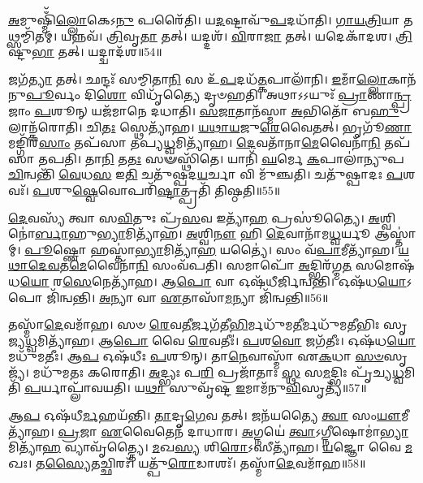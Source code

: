 \-\ul{𑌅}\-𑌮𑍁𑌷𑍍𑌮𑌿𑌁᳴\-\ul{𑌲𑍍𑌲𑍋}\-𑌕𑍇𑌽\-\ul{𑌨𑍁} 𑌪𑌰𑍈᳴𑌤𑌿।
𑌯\-\ul{𑌦}\-𑌷𑍍𑌟𑌾𑌵𑍁᳴\-\ul{𑌪}\-𑌦𑌧𑌾᳴𑌤𑌿।
\-\ul{𑌗𑌾}\-\-\ul{𑌯}\-\-\ul{𑌤𑍍𑌰𑌿}\-𑌯𑌾 𑌤𑌥𑍍𑌸𑌮𑍍𑌮𑌿᳴𑌤𑌮𑍍।
𑌯𑌨𑍍𑌨𑌵᳴।
\-\ul{𑌤𑍍𑌰𑌿}\-𑌵𑍃\-\ul{𑌤𑌾} 𑌤𑌤𑍍।
𑌯𑌦𑍍𑌦𑌶᳴।
\-\ul{𑌵𑌿}\-𑌰𑌾\-\ul{𑌜𑌾} 𑌤𑌤𑍍।
𑌯𑌦𑍇𑌕𑌾᳴𑌦𑌶।
\-\ul{𑌤𑍍𑌰𑌿}\-𑌷𑍍𑌟𑍁\-\ul{𑌭𑌾} 𑌤𑌤𑍍।
𑌯𑌦𑍍𑌦𑍍𑌵𑌾𑌦᳴𑌶॥54॥

𑌜𑌗᳴\-\ul{𑌤𑍍𑌯𑌾} 𑌤𑌤𑍍।
𑌛𑌨𑍍𑌦𑌃᳴ 𑌸𑌮𑍍𑌮𑌿𑌤𑌾\-\ul{𑌨𑌿} 𑌸 𑌉᳴\-\ul{𑌪}\-𑌦𑌧᳴\-\ul{𑌤𑍍𑌕}\-𑌪𑌾𑌲𑌾᳴𑌨𑌿।
\-\ul{𑌇}\-𑌮𑌾𑌁\-\ul{𑌲𑍍𑌲𑍋}\-𑌕𑌾𑌨᳴𑌨𑍁\-\ul{𑌪𑍂}\-𑌰𑍍𑌵𑌂 𑌦𑌿\-\ul{𑌶𑍋} 𑌵𑌿𑌧𑍃᳴𑌤𑍍𑌯𑍈 𑌦𑍃𑍞𑌹𑌤𑌿।
𑌅𑌥𑌾𑌽𑌽𑌯𑍁𑌃᳴ \ul{𑌪𑍍𑌰𑌾}\-𑌣𑌾\-\ul{𑌨𑍍𑌪𑍍𑌰}\-𑌜𑌾𑌂 \ul{𑌪}\-𑌶𑍂𑌨𑍍 𑌯𑌜᳴𑌮𑌾𑌨𑍇 𑌦𑌧𑌾𑌤𑌿।
\-\ul{𑌸}\-\-\ul{𑌜𑌾}\-𑌤𑌾𑌨᳴𑌸𑍍𑌮𑌾 \ul{𑌅}\-𑌭𑌿𑌤𑍋᳴ 𑌬\-\ul{𑌹𑍁}\-𑌲𑌾𑌨𑍍𑌕᳴𑌰𑍋𑌤𑌿।
𑌚𑌿\-\ul{𑌤𑌃} 𑌸𑍍𑌥𑍇𑌤𑍍𑌯𑌾᳴𑌹।
\-\ul{𑌯}\-\-\ul{𑌥𑌾}\-\-\ul{𑌯}\-𑌜𑍁\-\ul{𑌰𑍇}\-𑌵𑍈𑌤𑌤𑍍।
𑌭𑍃𑌗𑍂᳴\-\ul{𑌣𑌾}\-𑌮𑌙𑍍𑌗𑌿᳴𑌰\-\ul{𑌸𑌾𑌂} 𑌤𑌪᳴𑌸𑌾 𑌤𑌪𑍍𑌯\-\ul{𑌧𑍍𑌵}\-𑌮𑌿𑌤𑍍𑌯𑌾᳴𑌹।
\-\ul{𑌦𑍇}\-𑌵𑌤𑌾᳴𑌨𑌾\-\ul{𑌮𑍇}\-𑌵𑍈𑌨𑌾᳴\-\ul{𑌨𑌿} 𑌤𑌪᳴𑌸𑌾 𑌤𑌪𑌤𑌿।
𑌤𑌾\-\ul{𑌨𑌿} 𑌤\-\ul{𑌤𑌃} 𑌸𑍟𑌸𑍍𑌥𑌿᳴𑌤𑍇।
𑌯𑌾𑌨𑌿᳴ \ul{𑌘}\-𑌰𑍍𑌮𑍇 \ul{𑌕}\-𑌪𑌾𑌲𑌾॑𑌨𑍍𑌯𑍁𑌪\-\ul{𑌚𑌿}\-𑌨𑍍𑌵𑌨𑍍𑌤𑌿᳴ \ul{𑌵𑍇}\-𑌧\-\ul{𑌸} 𑌇\-\ul{𑌤𑌿} 𑌚𑌤𑍁᳴𑌷𑍍𑌪𑌦\-\ul{𑌯}\-𑌰𑍍𑌚𑌾 𑌵𑌿 𑌮𑍁᳴𑌞𑍍𑌚𑌤𑌿।
𑌚𑌤𑍁᳴𑌷𑍍𑌪𑌾𑌦𑌃 \ul{𑌪}\-𑌶𑌵𑌃᳴।
\-\ul{𑌪}\-𑌶𑍁\-\ul{𑌷𑍍𑌵𑍇}\-𑌵𑍋𑌪𑌰𑌿᳴\-\ul{𑌷𑍍𑌟𑌾}\-𑌤𑍍𑌪𑍍𑌰𑌤𑌿᳴ 𑌤𑌿𑌷𑍍𑌠𑌤𑌿॥55॥

\-\ul{𑌦𑍇}\-𑌵𑌸𑍍𑌯᳴ 𑌤𑍍𑌵𑌾 𑌸\-\ul{𑌵𑌿}\-𑌤𑍁𑌃 𑌪𑍍𑌰᳴\-\ul{𑌸}\-𑌵 𑌇𑌤𑍍𑌯𑌾᳴\-\ul{𑌹} 𑌪𑍍𑌰𑌸𑍂॑𑌤𑍍𑌯𑍈।
\-\ul{𑌅}\-𑌶𑍍𑌵𑌿𑌨𑍋॑\-\ul{𑌰𑍍𑌬𑌾}\-𑌹𑍁\-\ul{𑌭𑍍𑌯𑌾}\-𑌮𑌿\-𑌤𑍍𑌯𑌾᳴𑌹।
\-\ul{𑌅}\-𑌶𑍍𑌵𑌿\-\ul{𑌨𑍗} 𑌹𑌿 \ul{𑌦𑍇}\-𑌵𑌾𑌨𑌾᳴𑌮\-\ul{𑌧𑍍𑌵}\-𑌰𑍍𑌯𑍂 𑌆𑌸𑍍𑌤𑌾॑𑌮𑍍।
\-\ul{𑌪𑍂}\-𑌷𑍍𑌣𑍋 𑌹𑌸𑍍𑌤𑌾॑\-\ul{𑌭𑍍𑌯𑌾}\-𑌮𑌿𑌤𑍍𑌯𑌾᳴\-\ul{𑌹} 𑌯𑌤𑍍𑌯𑍈॑।
𑌸𑌂 𑌵᳴\-\ul{𑌪𑌾}\-𑌮𑍀𑌤𑍍𑌯𑌾᳴𑌹।
\-\ul{𑌯}\-\-\ul{𑌥𑌾}\-\-\ul{𑌦𑍇}\-\-\ul{𑌵}\-𑌤\-\ul{𑌮𑍇}\-𑌵𑍈𑌨𑌾᳴\-\ul{𑌨𑌿} 𑌸𑌂𑌵᳴𑌪𑌤𑌿।
𑌸𑌮𑌾𑌪𑍋᳴ \ul{𑌅}\-𑌦𑍍𑌭𑌿𑌰᳴𑌗𑍍𑌮\-\ul{𑌤} 𑌸𑌮𑍋𑌷᳴𑌧\-\ul{𑌯𑍋} 𑌰\-\ul{𑌸𑍇}\-𑌨𑍇𑌤𑍍𑌯𑌾᳴𑌹।
𑌆\-\ul{𑌪𑍋} 𑌵𑌾 𑌓𑌷᳴𑌧𑍀𑌰𑍍𑌜𑌿𑌨𑍍𑌵𑌨𑍍𑌤𑌿।
𑌓𑌷᳴𑌧\-\ul{𑌯𑍋}\-𑌽𑌪𑍋 𑌜𑌿᳴𑌨𑍍𑌵𑌨𑍍𑌤𑌿।
\-\ul{𑌅}\-𑌨𑍍𑌯𑌾 𑌵𑌾 \ul{𑌏}\-𑌤𑌾𑌸𑌾᳴\-\ul{𑌮}\-𑌨𑍍𑌯𑌾 𑌜𑌿᳴𑌨𑍍𑌵𑌨𑍍𑌤𑌿॥56॥

𑌤𑌸𑍍𑌮𑌾᳴\-\ul{𑌦𑍇}\-𑌵𑌮𑌾᳴𑌹।
𑌸𑍞 \ul{𑌰𑍇}\-𑌵\-\ul{𑌤𑍀}\-𑌰𑍍𑌜𑌗᳴𑌤𑍀\-\ul{𑌭𑌿}\-𑌰𑍍𑌮𑌧𑍁᳴𑌮\-\ul{𑌤𑍀}\-𑌰𑍍𑌮𑌧𑍁᳴𑌮𑌤𑍀𑌭𑌿𑌃 𑌸𑍃𑌜𑍍𑌯\-\ul{𑌧𑍍𑌵}\-𑌮𑌿𑌤𑍍𑌯𑌾᳴𑌹।
𑌆\-\ul{𑌪𑍋} 𑌵𑍈 \ul{𑌰𑍇}\-𑌵𑌤𑍀𑌃॑।
\-\ul{𑌪}\-𑌶\-\ul{𑌵𑍋} 𑌜𑌗᳴𑌤𑍀𑌃।
𑌓𑌷᳴𑌧\-\ul{𑌯𑍋} 𑌮𑌧𑍁᳴𑌮𑌤𑍀𑌃।
𑌆\-\ul{𑌪} 𑌓𑌷᳴𑌧𑍀𑌃 \ul{𑌪}\-𑌶𑍂𑌨𑍍।
𑌤𑌾\-\ul{𑌨𑍇}\-𑌵𑌾𑌸𑍍𑌮𑌾᳴ 𑌏\-\ul{𑌕}\-𑌧𑌾 \ul{𑌸}\-\-\ul{𑍞}\-𑌸𑍃𑌜𑍍𑌯᳴।
𑌮𑌧𑍁᳴𑌮𑌤𑌃 𑌕𑌰𑍋𑌤𑌿।
\-\ul{𑌅}\-𑌦𑍍𑌭𑍍𑌯𑌃 𑌪\-\ul{𑌰𑌿} 𑌪𑍍𑌰𑌜𑌾᳴𑌤𑌾𑌃 \ul{𑌸𑍍𑌥} 𑌸\-\ul{𑌮}\-𑌦𑍍𑌭𑌿𑌃 𑌪𑍃᳴𑌚𑍍𑌯\-\ul{𑌧𑍍𑌵}\-𑌮𑌿𑌤𑌿᳴ \ul{𑌪}\-𑌰𑍍𑌯𑌾𑌪𑍍𑌲𑌾᳴𑌵𑌯𑌤𑌿।
𑌯\-\ul{𑌥𑌾} 𑌸𑍁𑌵𑍃᳴𑌷𑍍𑌟 \ul{𑌇}\-𑌮𑌾𑌮᳴𑌨𑍁\-\ul{𑌵𑌿}\-𑌸𑍃𑌤𑍍𑌯᳴॥57॥

𑌆\-\ul{𑌪} 𑌓𑌷᳴𑌧𑍀\-\ul{𑌰𑍍𑌮}\-𑌹𑌯᳴𑌨𑍍𑌤𑌿।
\-\ul{𑌤𑌾}\-𑌦𑍃\-\ul{𑌗𑍇}\-𑌵 𑌤𑌤𑍍।
𑌜𑌨᳴𑌯𑌤𑍍𑌯𑍈 \ul{𑌤𑍍𑌵𑌾} 𑌸𑌂\-\ul{𑌯𑍗}\-𑌮𑍀𑌤𑍍𑌯𑌾᳴𑌹।
\-\ul{𑌪𑍍𑌰}\-𑌜𑌾 \ul{𑌏}\-𑌵𑍈𑌤𑍇𑌨᳴ 𑌦𑌾𑌧𑌾𑌰।
\-\ul{𑌅}\-𑌗𑍍𑌨𑌯𑍇॑ \ul{𑌤𑍍𑌵𑌾}\-\-𑌽𑌗𑍍𑌨𑍀𑌷𑍋𑌮𑌾॑\-\ul{𑌭𑍍𑌯𑌾}\-𑌮𑌿𑌤𑍍𑌯𑌾᳴\-\ul{𑌹} 𑌵𑍍𑌯𑌾𑌵𑍃᳴𑌤𑍍𑌤𑍍𑌯𑍈।
\-\ul{𑌮}\-𑌖\-\ul{𑌸𑍍𑌯} 𑌶𑌿\-\ul{𑌰𑍋}\-\-𑌽𑌸𑍀𑌤𑍍𑌯𑌾᳴𑌹।
\-\ul{𑌯}\-𑌜𑍍𑌞𑍋 𑌵𑍈 \ul{𑌮}\-𑌖𑌃।
𑌤\-\ul{𑌸𑍍𑌯𑍈}\-𑌤𑌚𑍍𑌛𑌿𑌰𑌃᳴।
𑌯𑌤𑍍𑌪𑍁᳴\-\ul{𑌰𑍋}\-𑌡𑌾𑌶𑌃᳴।
𑌤𑌸𑍍𑌮𑌾᳴\-\ul{𑌦𑍇}\-𑌵𑌮𑌾᳴𑌹॥58॥

